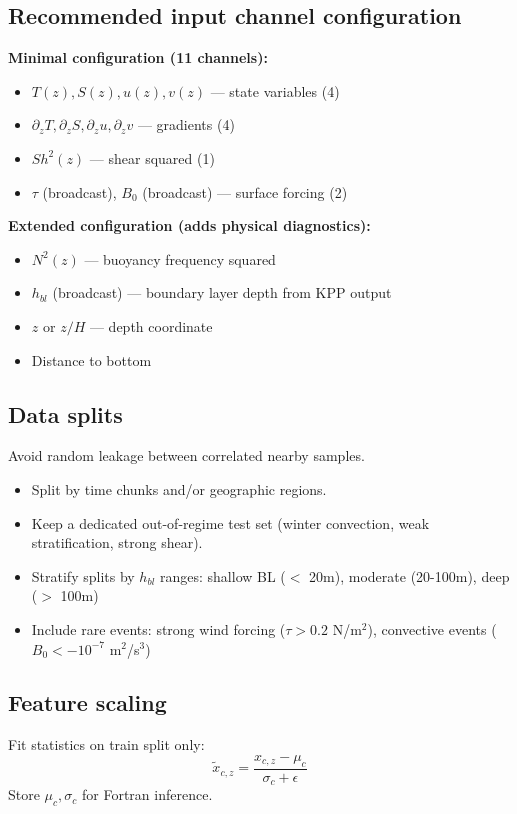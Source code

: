 \documentclass[11pt, a4paper]{article}
\begin{document}
\subsection{Recommended input channel configuration}

\textbf{Minimal configuration (11 channels):}
\begin{itemize}
    \item $T(z), S(z), u(z), v(z)$ — state variables (4)
    \item $\partial_z T, \partial_z S, \partial_z u, \partial_z v$ — gradients (4)
    \item $Sh^2(z)$ — shear squared (1)
    \item $\tau$ (broadcast), $B_0$ (broadcast) — surface forcing (2)
\end{itemize}

\textbf{Extended configuration (adds physical diagnostics):}
\begin{itemize}
    \item $N^2(z)$ — buoyancy frequency squared
    \item $h_{bl}$ (broadcast) — boundary layer depth from KPP output
    \item $z$ or $z/H$ — depth coordinate
    \item Distance to bottom
\end{itemize}

\subsection{Data splits}
Avoid random leakage between correlated nearby samples.
\begin{itemize}
    \item Split by time chunks and/or geographic regions.
    \item Keep a dedicated out-of-regime test set (winter convection, weak stratification, strong shear).
    \item Stratify splits by $h_{bl}$ ranges: shallow BL ($<$ 20m), moderate (20-100m), deep ($>$ 100m)
    \item Include rare events: strong wind forcing ($\tau > 0.2$ N/m$^2$), convective events ($B_0 < -10^{-7}$ m$^2$/s$^3$)
\end{itemize}

\subsection{Feature scaling}
Fit statistics on train split only:
\begin{equation}
\tilde{x}_{c,z} = \frac{x_{c,z} - \mu_c}{\sigma_c + \epsilon}
\end{equation}
Store $\mu_c, \sigma_c$ for Fortran inference.
\end{document}
